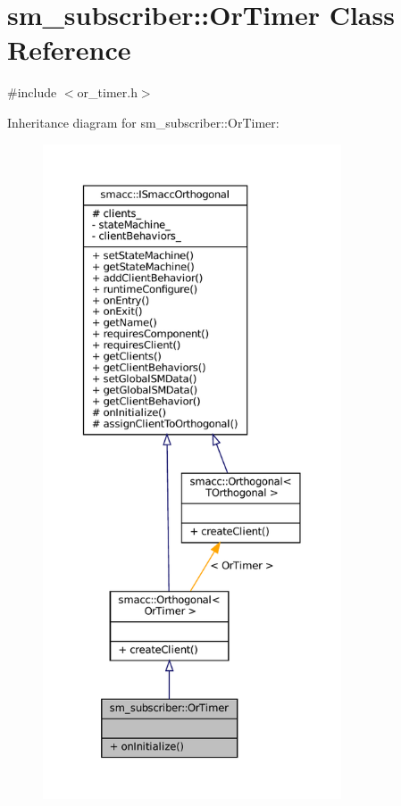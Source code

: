 \hypertarget{classsm__subscriber_1_1OrTimer}{}\section{sm\+\_\+subscriber\+:\+:Or\+Timer Class Reference}
\label{classsm__subscriber_1_1OrTimer}


{\ttfamily \#include $<$or\+\_\+timer.\+h$>$}



Inheritance diagram for sm\+\_\+subscriber\+:\+:Or\+Timer\+:
\nopagebreak
\begin{figure}[H]
\begin{center}
\leavevmode
\includegraphics[height=550pt]{classsm__subscriber_1_1OrTimer__inherit__graph}
\end{center}
\end{figure}


